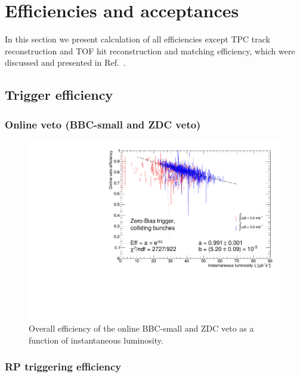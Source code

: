 \section{Efficiencies and acceptances}

In this section we present calculation of all efficiencies except TPC track reconstruction and TOF hit reconstruction and matching efficiency, which were discussed and presented in Ref.~\cite{supplementaryNote}.

\subsection{Trigger efficiency}\label{sec:triggerEff}
\subsubsection{Online veto (BBC-small and ZDC veto)}
\begin{figure}[ht!]
\centering%
\includegraphics[width=0.65\linewidth,page=1]{graphics/corrections/OnlineVetoEffVsInstLumi_graph.pdf}%
\caption{Overall efficiency of the online BBC-small and ZDC veto as a function of instantaneous luminosity.}\label{fig:onlineVetoEff}%
\end{figure}
\subsubsection{RP triggering efficiency}


